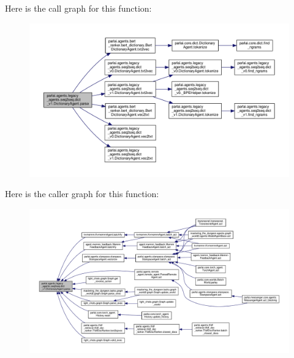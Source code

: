 Here is the call graph for this function\+:
\nopagebreak
\begin{figure}[H]
\begin{center}
\leavevmode
\includegraphics[width=350pt]{classparlai_1_1agents_1_1legacy__agents_1_1seq2seq_1_1dict__v1_1_1DictionaryAgent_acae89a6d1049de6fd2cab06c7804dcdd_cgraph}
\end{center}
\end{figure}
Here is the caller graph for this function\+:
\nopagebreak
\begin{figure}[H]
\begin{center}
\leavevmode
\includegraphics[width=350pt]{classparlai_1_1agents_1_1legacy__agents_1_1seq2seq_1_1dict__v1_1_1DictionaryAgent_acae89a6d1049de6fd2cab06c7804dcdd_icgraph}
\end{center}
\end{figure}
\mbox{\label{classparlai_1_1agents_1_1legacy__agents_1_1seq2seq_1_1dict__v1_1_1DictionaryAgent_abff9231bccd54f5222bef672dd978516}} 
